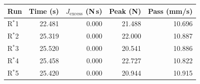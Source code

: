 \begin{tabular}{lrrrr}
\toprule
Run & Time (s) & $J_{\mathrm{excess}}$ (N\,s) & Peak (N) & Pass (mm/s) \\
\midrule
R$^{*}$1 & 22.481 & 0.000 & 21.488 & 10.696 \\
R$^{*}$2 & 25.319 & 0.000 & 22.000 & 10.887 \\
R$^{*}$3 & 25.520 & 0.000 & 20.541 & 10.886 \\
R$^{*}$4 & 25.458 & 0.000 & 22.727 & 10.822 \\
R$^{*}$5 & 25.420 & 0.000 & 20.944 & 10.915 \\
\bottomrule
\end{tabular}
